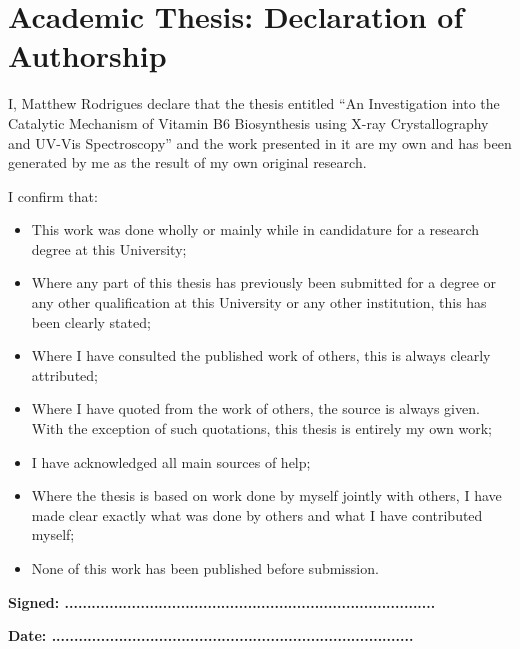 \chapter*{Academic Thesis: Declaration of Authorship}

I, Matthew Rodrigues declare that the thesis entitled ``An Investigation into the Catalytic Mechanism of Vitamin B6 Biosynthesis using X-ray Crystallography and UV-Vis Spectroscopy'' and the work presented in it are my own and has been generated by me as the result of my own original research.

I confirm that:
\begin{itemize}
			\item This work was done wholly or mainly while in candidature for a research degree at this University;
			\item Where any part of this thesis has previously been submitted for a degree or any other qualification at this University or any other institution, this has been clearly stated; 
			\item Where I have consulted the published work of others, this is always clearly attributed; 
			\item Where I have quoted from the work of others, the source is always given. With the exception of such quotations, this thesis is entirely my own work;
			\item I have acknowledged all main sources of help;
			\item Where the thesis is based on work done by myself jointly with others, I have made clear exactly what was done by others and what I have contributed myself;
			\item None of this work has been published before submission.
\end{itemize}
\vspace*{3\baselineskip}
\textbf{Signed: ...................................................................................}
\par
\vspace*{3\baselineskip}
\textbf{Date: .................................................................................}
\newpage